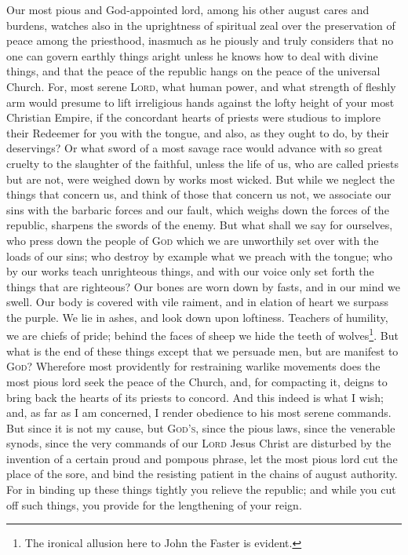 Our most pious and God-appointed lord, among his other august cares and burdens, watches also in the uprightness of spiritual zeal over the preservation of peace among the priesthood, inasmuch as he piously and truly considers that no one can govern earthly things aright unless he knows how to deal with divine things, and that the peace of the republic hangs on the peace of the universal Church. For, most serene \textsc{Lord}, what human power, and what strength of fleshly arm would presume to lift irreligious hands against the lofty height of your most Christian Empire, if the concordant hearts of priests were studious to implore their Redeemer for you with the tongue, and also, as they ought to do, by their deservings? Or what sword of a most savage race would advance with so great cruelty to the slaughter of the faithful, unless the life of us, who are called priests but are not, were weighed down by works most wicked. But while we neglect the things that concern us, and think of those that concern us not, we associate our sins with the barbaric forces and our fault, which weighs down the forces of the republic, sharpens the swords of the enemy. But what shall we say for ourselves, who press down the people of \textsc{God} which we are unworthily set over with the loads of our sins; who destroy by example what we preach with the tongue; who by our works teach unrighteous things, and with our voice only set forth the things that are righteous? Our bones are worn down by fasts, and in our mind we swell. Our body is covered with vile raiment, and in elation of heart we surpass the purple. We lie in ashes, and look down upon loftiness. Teachers of humility, we are chiefs of pride; behind the faces of sheep we hide the teeth of wolves\footnote{The ironical allusion here to John the Faster is evident.}. But what is the end of these things except that we persuade men, but are manifest to \textsc{God}? Wherefore most providently for restraining warlike movements does the most pious lord seek the peace of the Church, and, for compacting it, deigns to bring back the hearts of its priests to concord. And this indeed is what I wish; and, as far as I am concerned, I render obedience to his most serene commands. But since it is not my cause, but \textsc{God’s}, since the pious laws, since the venerable synods, since the very commands of our \textsc{Lord} Jesus Christ are disturbed by the invention of a certain proud and pompous phrase, let the most pious lord cut the place of the sore, and bind the resisting patient in the chains of august authority. For in binding up these things tightly you relieve the republic; and while you cut off such things, you provide for the lengthening of your reign.

